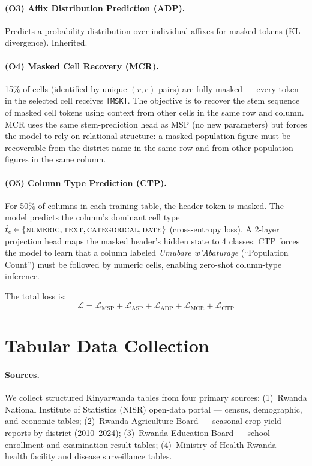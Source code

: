 \documentclass[11pt]{article}
\begin{document}
\paragraph{(O3) Affix Distribution Prediction (ADP).}
Predicts a probability distribution over individual affixes for masked tokens (KL divergence). Inherited.

\paragraph{(O4) Masked Cell Recovery (MCR).}
15\% of cells (identified by unique $(r,c)$ pairs) are fully masked --- every token in the selected cell receives \texttt{[MSK]}.
The objective is to recover the stem sequence of masked cell tokens using context from other cells in the same row and column.
MCR uses the same stem-prediction head as MSP (no new parameters) but forces the model to rely on relational structure: a masked population figure must be recoverable from the district name in the same row and from other population figures in the same column.

\paragraph{(O5) Column Type Prediction (CTP).}
For 50\% of columns in each training table, the header token is masked.
The model predicts the column's dominant cell type $\hat{t}_c \in \{\textsc{numeric}, \textsc{text}, \textsc{categorical}, \textsc{date}\}$ (cross-entropy loss).
A 2-layer projection head maps the masked header's hidden state to 4 classes.
CTP forces the model to learn that a column labeled \textit{Umubare w'Abaturage} (``Population Count'') must be followed by numeric cells, enabling zero-shot column-type inference.

The total loss is:
\begin{equation}
\mathcal{L} = \mathcal{L}_{\text{MSP}} + \mathcal{L}_{\text{ASP}} + \mathcal{L}_{\text{ADP}} + \mathcal{L}_{\text{MCR}} + \mathcal{L}_{\text{CTP}}
\end{equation}

\section{Tabular Data Collection}
\label{sec:data}

\paragraph{Sources.}
We collect structured Kinyarwanda tables from four primary sources: (1)~Rwanda National Institute of Statistics (NISR) open-data portal --- census, demographic, and economic tables; (2)~Rwanda Agriculture Board --- seasonal crop yield reports by district (2010--2024); (3)~Rwanda Education Board --- school enrollment and examination result tables; (4)~Ministry of Health Rwanda --- health facility and disease surveillance tables.
\end{document}
